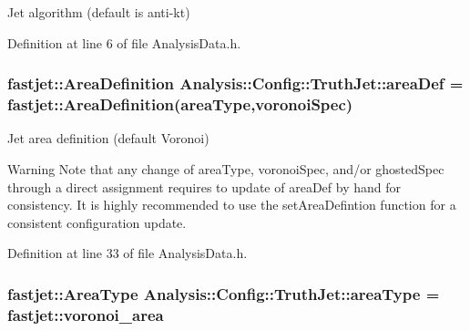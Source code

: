 Jet algorithm (default is anti-\/kt) 



Definition at line 6 of file Analysis\+Data.\+h.

\subsubsection[{\texorpdfstring{area\+Def}{areaDef}}]{\setlength{\rightskip}{0pt plus 5cm}fastjet\+::\+Area\+Definition Analysis\+::\+Config\+::\+Truth\+Jet\+::area\+Def = fastjet\+::\+Area\+Definition({\bf area\+Type},{\bf voronoi\+Spec})\hspace{0.3cm}{\ttfamily [static]}}\hypertarget{namespaceAnalysis_1_1Config_1_1TruthJet_aaaf974e7a2655200c6cd5aa5b6f86f90}{}\label{namespaceAnalysis_1_1Config_1_1TruthJet_aaaf974e7a2655200c6cd5aa5b6f86f90}


Jet area definition (default Voronoi) 

\begin{DoxyWarning}{Warning}
Note that any change of {\ttfamily area\+Type}, {\ttfamily voronoi\+Spec}, and/or {\ttfamily ghosted\+Spec} through a direct assignment requires to update of {\ttfamily area\+Def} by hand for consistency. It is highly recommended to use the {\ttfamily set\+Area\+Defintion} function for a consistent configuration update. 
\end{DoxyWarning}


Definition at line 33 of file Analysis\+Data.\+h.

\subsubsection[{\texorpdfstring{area\+Type}{areaType}}]{\setlength{\rightskip}{0pt plus 5cm}fastjet\+::\+Area\+Type Analysis\+::\+Config\+::\+Truth\+Jet\+::area\+Type = fastjet\+::voronoi\+\_\+area\hspace{0.3cm}{\ttfamily [static]}}\hypertarget{namespaceAnalysis_1_1Config_1_1TruthJet_a1d08c937d56d2b35cdc78f99825a6af2}{}\label{namespaceAnalysis_1_1Config_1_1TruthJet_a1d08c937d56d2b35cdc78f99825a6af2}


